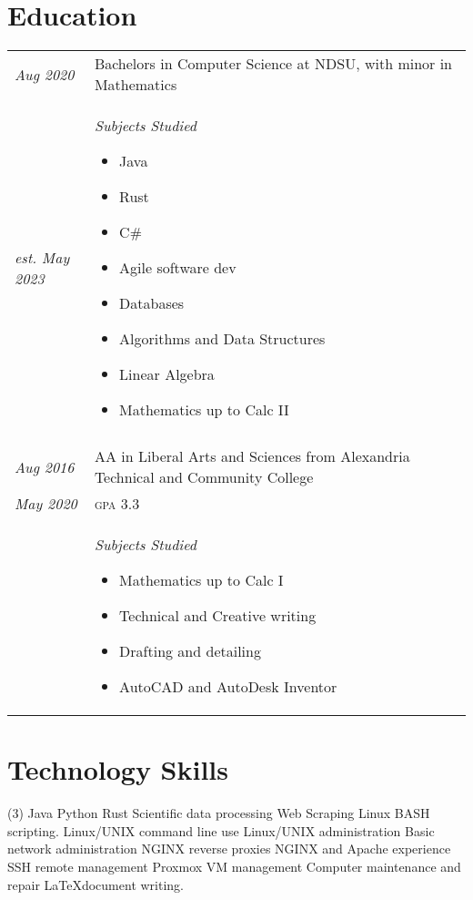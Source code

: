 \documentclass[letterpaper,10pt]{article}
\begin{document}
\section*{Education}
	\begin{tabular}{R{2cm}|p{14cm}}
	\textsl{Aug 2020} & Bachelors in Computer Science at NDSU, with minor in Mathematics\\
	\textsl{est. May 2023} & \textsl{Subjects Studied}
	\begin{itemize}[noitemsep]
		\item Java
		\item Rust
		\item C\#
		\item Agile software dev
		\item Databases
		\item Algorithms and Data Structures
		\item Linear Algebra
		\item Mathematics up to Calc II
	\end{itemize}\\
	\\
	\textsl{Aug 2016} & AA in Liberal Arts and Sciences from Alexandria Technical and Community College\\
	\textsl{May 2020} & \textsc{gpa} 3.3\\
	&\textsl{Subjects Studied}
	\begin{itemize}[noitemsep]
		\item Mathematics up to Calc I
		\item Technical and Creative writing
		\item Drafting and detailing
		\item AutoCAD and AutoDesk Inventor
	\end{itemize}
	\end{tabular}
\newpage
\section*{Technology Skills}
	\begin{tasks}[style=itemize](3)
	\task Java
	\task Python
	\task Rust
	\task Scientific data processing
	\task Web Scraping
	\task Linux BASH scripting.
	\task Linux/UNIX command line use
	\task Linux/UNIX administration
	\task Basic network administration
	\task NGINX reverse proxies
	\task NGINX and Apache experience
	\task SSH remote management
	\task Proxmox VM management
	\task Computer maintenance and repair
	\task \LaTeX document writing.
	\end{tasks}
\end{document}
